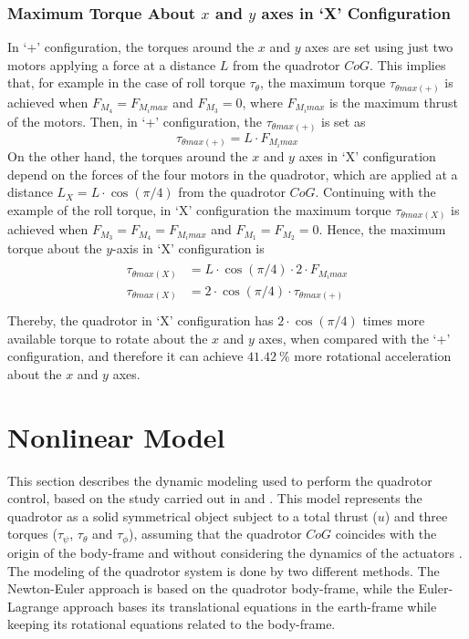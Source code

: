 \subsubsection{Maximum Torque About $x$ and $y$ axes in `X' Configuration}
In `+' configuration, the torques around the $x$ and $y$ axes are set using just two motors applying a force at a distance $L$ from the quadrotor $CoG$. This implies that, for example in the case of roll torque $\tau_\theta$, the maximum torque $\tau_{\theta max (+)}$ is achieved when $F_{M_4} = F_{M_i max}$ and $F_{M_3} = 0$, where $F_{M_i max}$ is the maximum thrust of the motors. Then, in `+' configuration, the $\tau_{\theta max (+)}$ is set as
\begin{equation}
\tau_{\theta max (+)} = L\cdot F_{M_i max}
\end{equation}
On the other hand, the torques around the $x$ and $y$ axes in `X' configuration depend on the forces of the four motors in the quadrotor, which are applied at a distance $L_{X} = L\cdot \cos(\pi/4)$ from the quadrotor $CoG$. Continuing with the example of the roll torque, in `X' configuration the maximum torque $\tau_{\theta max (X)}$ is achieved when $F_{M_3} = F_{M_4} = F_{M_i max}$ and $F_{M_1} = F_{M_2} = 0$. Hence, the maximum torque about the $y$-axis in `X' configuration is
\begin{align}
\begin{split}
\tau_{\theta max (X)} & = L\cdot \cos(\pi/4) \cdot 2 \cdot F_{M_i max}\\[5px]
\tau_{\theta max (X)} & = 2\cdot \cos(\pi/4) \cdot \tau_{\theta max (+)}\\[5px]
\end{split}
\end{align}
Thereby, the quadrotor in `X' configuration has $2\cdot \cos(\pi/4)$ times more available torque to rotate about the $x$ and $y$ axes, when compared with the `+' configuration, and therefore it can achieve $41.42\ \%$ more rotational acceleration about the $x$ and $y$ axes.


\section{Nonlinear Model}
\label{sec:nonlinear}

This section describes the dynamic modeling used to perform the quadrotor control, based on the study carried out in \cite{Bresciani2008} and \cite{Bouabdallah2007}. This model represents the quadrotor as a solid symmetrical object subject to a total thrust ($u$) and three torques ($\tau_\psi$, $\tau_\theta$ and $\tau_\phi$), assuming that the quadrotor $CoG$ coincides with the origin of the body-frame and without considering the dynamics of the actuators . The modeling of the quadrotor system is done by two different methods. The Newton-Euler approach is based on the quadrotor body-frame, while the Euler-Lagrange approach bases its translational equations in the earth-frame while keeping its rotational equations related to the body-frame.


